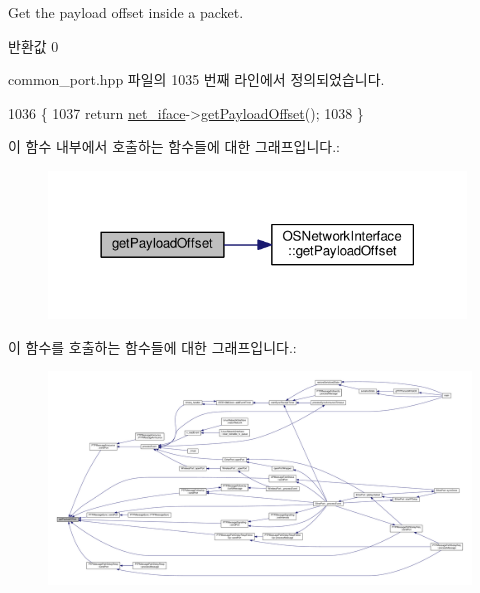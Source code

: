 Get the payload offset inside a packet. 

\begin{DoxyReturn}{반환값}
0 
\end{DoxyReturn}


common\+\_\+port.\+hpp 파일의 1035 번째 라인에서 정의되었습니다.


\begin{DoxyCode}
1036     \{
1037         \textcolor{keywordflow}{return} \hyperlink{class_common_port_a7bc95d8cb3e95a8e7f9c5dc261289e37}{net\_iface}->\hyperlink{class_o_s_network_interface_a7a0710f80e693b0d4008d8501aaffcdc}{getPayloadOffset}();
1038     \}
\end{DoxyCode}


이 함수 내부에서 호출하는 함수들에 대한 그래프입니다.\+:
\nopagebreak
\begin{figure}[H]
\begin{center}
\leavevmode
\includegraphics[width=314pt]{class_common_port_a2697fd0fc7139659877b76cd1b022d44_cgraph}
\end{center}
\end{figure}




이 함수를 호출하는 함수들에 대한 그래프입니다.\+:
\nopagebreak
\begin{figure}[H]
\begin{center}
\leavevmode
\includegraphics[width=350pt]{class_common_port_a2697fd0fc7139659877b76cd1b022d44_icgraph}
\end{center}
\end{figure}


